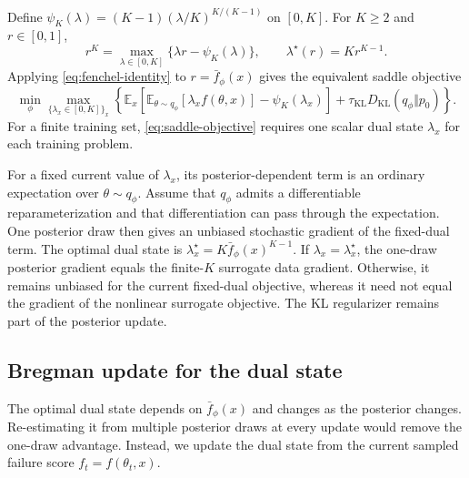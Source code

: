 Define $\psi_K(\lambda)=(K-1)(\lambda/K)^{K/(K-1)}$ on $[0,K]$.
For $K\geq2$ and $r\in[0,1]$,
\begin{equation}
  r^K
  =
  \max_{\lambda\in[0,K]}
  \{\lambda r-\psi_K(\lambda)\},
  \qquad
  \lambda^\star(r)=Kr^{K-1}.
  \label{eq:fenchel-identity}
\end{equation}
Applying \cref{eq:fenchel-identity} to $r=\bar f_\phi(x)$ gives the equivalent saddle objective
\begin{equation}
  \min_\phi
  \max_{\{\lambda_x\in[0,K]\}_x}
  \left\{
    \mathbb E_x
    \left[
      \mathbb E_{\theta\sim q_\phi}[\lambda_x f(\theta,x)]
      -\psi_K(\lambda_x)
    \right]
    +
    \tau_{\mathrm{KL}}D_{\mathrm{KL}}(q_\phi\Vert p_0)
  \right\}.
  \label{eq:saddle-objective}
\end{equation}
For a finite training set, \cref{eq:saddle-objective} requires one scalar dual state $\lambda_x$ for each training problem.

For a fixed current value of $\lambda_x$, its posterior-dependent term is an ordinary expectation over $\theta\sim q_\phi$.
Assume that $q_\phi$ admits a differentiable reparameterization and that differentiation can pass through the expectation.
One posterior draw then gives an unbiased stochastic gradient of the fixed-dual term.
The optimal dual state is $\lambda_x^\star=K\bar f_\phi(x)^{K-1}$.
If $\lambda_x=\lambda_x^\star$, the one-draw posterior gradient equals the finite-$K$ surrogate data gradient.
Otherwise, it remains unbiased for the current fixed-dual objective, whereas it need not equal the gradient of the nonlinear surrogate objective.
The KL regularizer remains part of the posterior update.

\subsection{Bregman update for the dual state}
\label{sec:bregman-tracking}

The optimal dual state depends on $\bar f_\phi(x)$ and changes as the posterior changes.
Re-estimating it from multiple posterior draws at every update would remove the one-draw advantage.
Instead, we update the dual state from the current sampled failure score $f_t=f(\theta_t,x)$.

